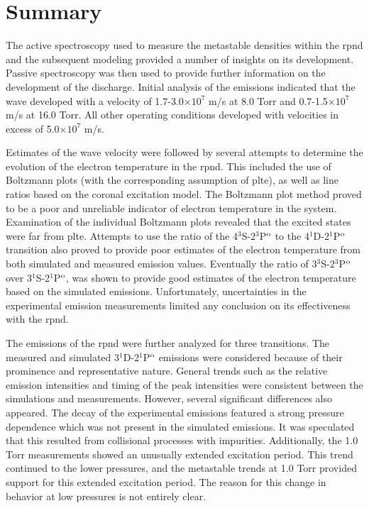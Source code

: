 \section{Summary}

The active spectroscopy used to measure the metastable densities within the
\acs{rpnd} and the subsequent modeling provided a number of insights on its
development. Passive spectroscopy was then used to provide further information
on the development of the discharge. Initial analysis of the emissions indicated
that the wave developed with a velocity of 1.7-3.0$\times10^7$ m/s at 8.0 Torr
and 0.7-1.5$\times10^7$ m/s at 16.0 Torr. All other operating conditions
developed with velocities in excess of 5.0$\times10^7$ m/s.

Estimates of the wave velocity were followed by several attempts to determine
the evolution of the electron temperature in the \acs{rpnd}. This included the
use of Boltzmann plots (with the corresponding assumption of \acs{plte}), as
well as line ratios based on the coronal excitation model. The Boltzmann plot
method proved to be a poor and unreliable indicator of electron temperature in
the system. Examination of the individual Boltzmann plots revealed that the
excited states were far from \acs{plte}. Attempts to use the ratio of the
4$^3$S-2$^3$P$^\mathrm{o}$ to the 4$^1$D-2$^1$P$^\mathrm{o}$ transition also proved to provide
poor estimates of the electron temperature from both simulated and measured
emission values. Eventually the ratio of 3$^3$S-2$^3$P$^\mathrm{o}$ over
3$^1$S-2$^1$P$^\mathrm{o}$, was shown to provide good estimates of the electron
temperature based on the simulated emissions. Unfortunately, uncertainties in
the experimental emission measurements limited any conclusion on its
effectiveness with the \acs{rpnd}.

The emissions of the \acs{rpnd} were further analyzed for three transitions. The
measured and simulated 3$^1$D-2$^1$P$^\mathrm{o}$ emissions were considered because of
their prominence and representative nature. General trends such as the relative
emission intensities and timing of the peak intensities were consistent between
the simulations and measurements. However, several significant differences also
appeared. The decay of the experimental emissions featured a strong pressure
dependence which was not present in the simulated emissions. It was speculated
that this resulted from collisional processes with impurities. Additionally, the
1.0 Torr measurements showed an unusually extended excitation period. This trend
continued to the lower pressures, and the metastable trends at 1.0 Torr provided
support for this extended excitation period. The reason for this change in
behavior at low pressures is not entirely clear.

